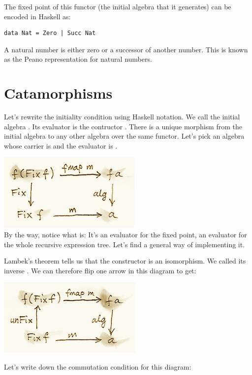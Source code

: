 The fixed point of this functor (the initial algebra that it generates)
can be encoded in Haskell as:

\begin{verbatim}
data Nat = Zero | Succ Nat
\end{verbatim}

A natural number is either zero or a successor of another number. This
is known as the Peano representation for natural numbers.

\section{Catamorphisms}\label{catamorphisms}

Let's rewrite the initiality condition using Haskell notation. We call
the initial algebra . Its evaluator is the contructor
. There is a unique morphism  from the initial
algebra to any other algebra over the same functor. Let's pick an
algebra whose carrier is  and the evaluator is .

\includegraphics{images/alg5.png}\\
By the way, notice what  is: It's an evaluator for the fixed
point, an evaluator for the whole recursive expression tree. Let's find
a general way of implementing it.

Lambek's theorem tells us that the constructor  is an
isomorphism. We called its inverse . We can therefore flip
one arrow in this diagram to get:

\includegraphics{images/alg6.png}

Let's write down the commutation condition for this diagram:

